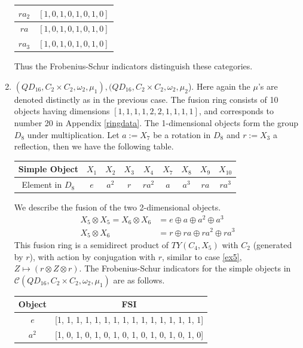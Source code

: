 \documentclass[a4paper, 10pt]{book}
\theoremstyle{definition}
\numberwithin{equation}{chapter}
\newcommand\ot{\otimes}
\newcommand\C{\mathcal C}
\begin{document}
\begin{enumerate}
\begin{center}
\begin{tabular}{|c|c|}
$ra_2$ & $[1, 0, 1, 0, 1, 0, 1, 0]$   \\ \hline
$ra$   & $[1, 0, 1, 0, 1, 0, 1, 0]$   \\ \hline
$ra_3$ & $[1, 0, 1, 0, 1, 0, 1, 0]$   \\ \hline
\end{tabular}
\end{center}
Thus the Frobenius-Schur indicators distinguish these categories.
\item \label{ex9} $(QD_{16}, C_2\times C_2, \omega_2, \mu_1), (QD_{16}, C_2\times C_2, \omega_2, \mu_2$). Here again the $\mu$'s are denoted distinctly as in the previous case. The fusion ring consists of 10 objects having dimensions $[1, 1, 1, 1, 2, 2, 1, 1, 1, 1]$, and corresponds to number 20 in Appendix \ref{ringdata}. The 1-dimensional objects form the group $D_8$ under multiplication. Let $a:=X_7$ be a rotation in $D_8$ and $r:=X_3$ a reflection, then we have the following table. 
\begin{center}
\begin{tabular}{ | c |c |c |c |c |c |c |c |c|}
\hline
Simple Object & $X_1$& $X_2$ & $X_3$  & $X_4$ & $X_7$ & $X_8$ & $X_9$ & $X_{10}$    \\ 
\hline
Element in $D_8$ & $e$& $a^2$ & $r$ &  $ra^2$ & $a$ & $a^3$ & $ra$ & $ra^3$\\
\hline
\end{tabular}
\end{center}
We describe the fusion of the two 2-dimensional objects.
\begin{align*}
X_5\ot X_5 = X_6 \ot X_6 &= e \oplus a \oplus a^2 \oplus a^3\\
X_5 \ot X_6 &= r\oplus ra\oplus ra^2 \oplus ra^3	
\end{align*}
This fusion ring is a semidirect product of  $TY(C_4, X_5)$ with $C_2$ (generated by $r$), with action by conjugation with $r$, similar to case \ref{ex5}, $
	Z \mapsto (r\ot Z\ot r) $. The Frobenius-Schur indicators for the simple objects in $\C(QD_{16}, C_2\times C_2, \omega_2, \mu_1)$ are as follows.
\begin{center}
\begin{tabular}{|c|c|}
\hline
Object & FSI                                                              \\ \hline
$e$    & {[}1, 1, 1, 1, 1, 1, 1, 1, 1, 1, 1, 1, 1, 1, 1, 1{]}             \\ \hline
$a^2$  & {[}1, 0, 1, 0, 1, 0, 1, 0, 1, 0, 1, 0, 1, 0, 1, 0{]}             \\ \hline

\end{tabular}
\end{center}
\end{enumerate}
\end{document}
